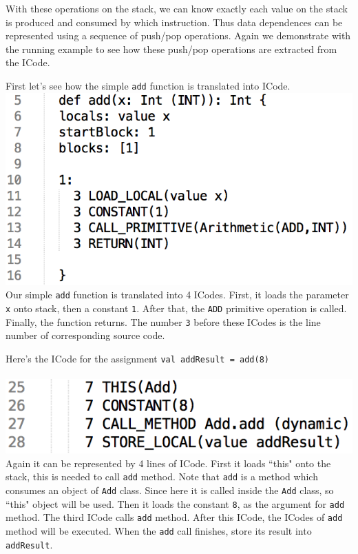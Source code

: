 \documentclass{article}[12pt]
\begin{document}
With these operations on the stack, we can know exactly each value on the stack is produced and consumed by which instruction. Thus data dependences can be represented using a sequence of push/pop operations. Again we demonstrate with the running example to see how these push/pop operations are extracted from the ICode. 

First let's see how the simple \texttt{add} function is translated into ICode.
\\
\includegraphics[scale=0.5]{figures/figure4}
\\
Our simple \texttt{add} function is translated into 4 ICodes. First, it loads the parameter \texttt{x} onto stack, then a constant \texttt{1}. After that, the \texttt{ADD} primitive operation is called. Finally, the function returns. The number \texttt{3} before these ICodes is the line number of corresponding source code. 

Here's the ICode for the assignment \texttt{val addResult = add(8)}\\
\\
\includegraphics[scale=0.5]{figures/figure5}
\\
Again it can be represented by 4 lines of ICode. First it loads ``this" onto the stack, this is needed to call \texttt{add} method. Note that \texttt{add} is a method which consumes an object of \texttt{Add} class. Since here it is called inside the \texttt{Add} class, so ``this" object will be used. Then it loads the constant \texttt{8}, as the argument for \texttt{add} method. The third ICode calls \texttt{add} method. After this ICode, the ICodes of \texttt{add} method will be executed. When the \texttt{add} call finishes, store its result into \texttt{addResult}. 
\end{document}
